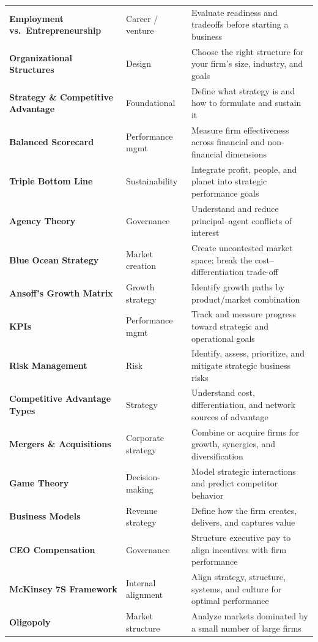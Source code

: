 \documentclass[11pt, letterpaper]{article}
\begin{document}
\begin{center}
\begin{tabular}{>{\bfseries}p{3.8cm} p{3cm} p{6.5cm}}
\addlinespace
Employment vs.\ Entrepreneurship & Career / venture & Evaluate readiness and tradeoffs before starting a business \\
\addlinespace
Organizational Structures & Design & Choose the right structure for your firm's size, industry, and goals \\
\addlinespace
Strategy \& Competitive Advantage & Foundational & Define what strategy is and how to formulate and sustain it \\
\addlinespace
Balanced Scorecard & Performance mgmt & Measure firm effectiveness across financial and non-financial dimensions \\
\addlinespace
Triple Bottom Line & Sustainability & Integrate profit, people, and planet into strategic performance goals \\
\addlinespace
Agency Theory & Governance & Understand and reduce principal--agent conflicts of interest \\
\addlinespace
Blue Ocean Strategy & Market creation & Create uncontested market space; break the cost--differentiation trade-off \\
\addlinespace
Ansoff's Growth Matrix & Growth strategy & Identify growth paths by product/market combination \\
\addlinespace
KPIs & Performance mgmt & Track and measure progress toward strategic and operational goals \\
\addlinespace
Risk Management & Risk & Identify, assess, prioritize, and mitigate strategic business risks \\
\addlinespace
Competitive Advantage Types & Strategy & Understand cost, differentiation, and network sources of advantage \\
\addlinespace
Mergers \& Acquisitions & Corporate strategy & Combine or acquire firms for growth, synergies, and diversification \\
\addlinespace
Game Theory & Decision-making & Model strategic interactions and predict competitor behavior \\
\addlinespace
Business Models & Revenue strategy & Define how the firm creates, delivers, and captures value \\
\addlinespace
CEO Compensation & Governance & Structure executive pay to align incentives with firm performance \\
\addlinespace
McKinsey 7S Framework & Internal alignment & Align strategy, structure, systems, and culture for optimal performance \\
\addlinespace
Oligopoly & Market structure & Analyze markets dominated by a small number of large firms \\

\end{tabular}
\end{center}
\end{document}
